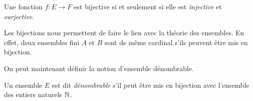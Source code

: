 \begin{prop}[Caractérisation]
    Une fonction $f : E \longrightarrow F$ est bijective si et seulement si elle est \emph{injective} et \emph{surjective}.
\end{prop}

\begin{proposition}
    Les bijections nous permettent de faire le lien avec la théorie des ensembles. 
    En effet, deux ensembles fini $A$ et $B$ sont de même cardinal s'ils peuvent être mis en bijection. 
\end{proposition}

On peut maintenant définir la notion d'ensemble dénombrable. 

\begin{definition}
    Un ensemble $E$ est dit \emph{dénombrable} s'il peut être mis en bijection avec l'ensemble des
    entiers naturels $\mathbb{N}$. 
\end{definition}


